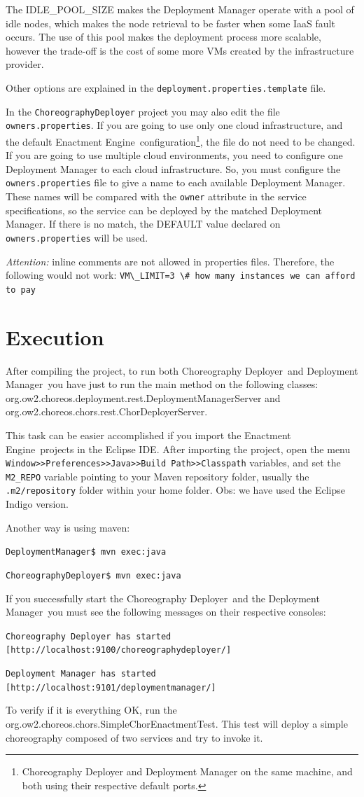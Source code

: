 \documentclass[a4paper, 10pt]{article}
\newcommand{\ee}{Enactment Engine}
\newcommand{\cd}{Choreography Deployer}
\newcommand{\dm}{Deployment Manager}
\begin{document}
The IDLE\_POOL\_SIZE makes the Deployment Manager operate with a pool of idle nodes, which makes the node retrieval to be faster when some IaaS fault occurs. The use of this pool makes the deployment process more scalable, however the trade-off is the cost of some more VMs created by the infrastructure provider. 

Other options are explained in the \texttt{deployment.properties.template} file.

In the \texttt{ChoreographyDeployer} project you may also edit the file \texttt{owners.properties}. If you are going to use only one cloud infrastructure, and the default \ee\ configuration\footnote{Choreography Deployer and Deployment Manager on the same machine, and both using their respective default ports.}, the file do not need to be changed. If you are going to use multiple cloud environments, you need to configure one Deployment Manager to each cloud infrastructure. So, you must configure the \texttt{owners.properties} file to give a name to each available Deployment Manager. These names will be compared with the \texttt{owner} attribute in the  service specifications, so the service can be deployed by the matched Deployment Manager. If there is no match, the DEFAULT value declared on \texttt{owners.properties} will be used.

\emph{Attention:} inline comments are not allowed in properties files. Therefore, the following would not work: \verb!VM\_LIMIT=3 \# how many instances we can afford to pay!

\section{Execution}

After compiling the project, to run both \cd\ and \dm\ you have just to run the main method on the following classes: \textsf{org.ow2.choreos.deployment.rest.DeploymentManagerServer} and \textsf{org.ow2.choreos.chors.rest.ChorDeployerServer}.

This task can be easier accomplished if you import the \ee\ projects in the Eclipse IDE. After importing the project, open the menu \texttt{Window>>Preferences>>Java>>Build Path>>Classpath} variables, and set the \texttt{M2\_REPO} variable pointing to your Maven repository folder, usually the \texttt{.m2/repository} folder within your home folder. Obs: we have used the Eclipse Indigo version.

Another way is using maven:

\texttt{DeploymentManager\$ mvn exec:java}

\texttt{ChoreographyDeployer\$ mvn exec:java}

If you successfully start the \cd\ and the \dm\, you must see the following messages on their respective consoles: 

\texttt{\cd\ has started [http://localhost:9100/choreographydeployer/]}

\texttt{\dm\ has started [http://localhost:9101/deploymentmanager/]}

To verify if it is everything OK, run the \textsf{org.ow2.choreos.chors.SimpleChorEnactmentTest}. This test will deploy a simple choreography composed of two services and try to invoke it.
\end{document}
